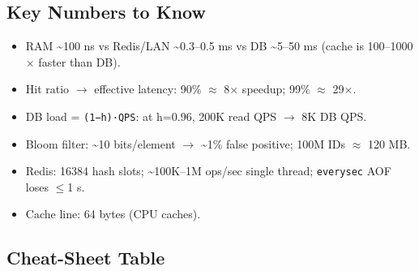 \documentclass[11pt]{article}
\providecommand{\tightlist}{\setlength{\itemsep}{1pt}\setlength{\parskip}{0pt}}
\begin{document}
\subsection{Key Numbers to Know}\label{key-numbers-to-know}

\begin{itemize}
\tightlist
\item
  RAM \textasciitilde100 ns vs Redis/LAN \textasciitilde0.3--0.5 ms vs DB \textasciitilde5--50 ms (cache is 100--1000\(\times\) faster than DB).
\item
  Hit ratio \(\rightarrow\) effective latency: 90\% \(\approx\) 8\(\times\) speedup; 99\% \(\approx\) 29\(\times\).
\item
  DB load = \texttt{(1−h)·QPS}: at h=0.96, 200K read QPS \(\rightarrow\) 8K DB QPS.
\item
  Bloom filter: \textasciitilde10 bits/element \(\rightarrow\) \textasciitilde1\% false positive; 100M IDs \(\approx\) 120 MB.
\item
  Redis: 16384 hash slots; \textasciitilde100K--1M ops/sec single thread; \texttt{everysec} AOF loses \(\leq\)1 s.
\item
  Cache line: 64 bytes (CPU caches).
\end{itemize}

\subsection{Cheat-Sheet Table}\label{cheat-sheet-table}
\end{document}
